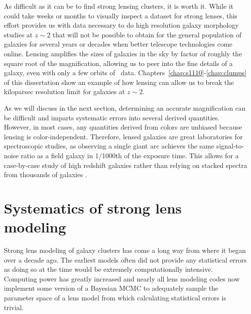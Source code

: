 As difficult as it can be to find strong lensing clusters, it is worth it. While it could take weeks or months to visually inspect a dataset for strong lenses, this effort provides us with data necessary to do high resolution galaxy morphology studies at $z\sim2$ that will not be possible to obtain for the general population of galaxies for several years or decades when better telescope technologies come online. Lensing amplifies the sizes of galaxies in the sky by factor of roughly the square root of the magnification, allowing us to peer into the fine details of a galaxy, even with only a few orbits of \hst\ data. Chapters~\ref{chap:s1110}-\ref{chap:clumps} of this dissertation show an example of how lensing can allow us to break the kiloparsec resolution limit for galaxies at $z\sim2$. 

As we will discuss in the next section, determining an accurate magnification can be difficult and imparts systematic errors into several derived quantities. However, in most cases, any quantities derived from colors are unbiased because lensing is color-independent. Therefore, lensed galaxies are great laboratories for spectroscopic studies, as observing a single giant arc achieves the same signal-to-noise ratio as a field galaxy in 1/1000th of the exposure time. This allows for a case-by-case study of high redshift galaxies \citep[e.g., ][]{Rigby:2018hs,Rigby:2017yb} rather than relying on stacked spectra from thousands of galaxies \citep[e.g., ][]{Shapley:2003fk}.

\section{Systematics of strong lens modeling}

Strong lens modeling of galaxy clusters has come a long way from where it began over a decade ago. The earliest models often did not provide any statistical errors as doing so at the time would be extremely computationally intensive. Computing power has greatly increased and nearly all lens modeling codes now implement some version of a Bayesian MCMC to adequately sample the parameter space of a lens model from which calculating statistical errors is trivial.

